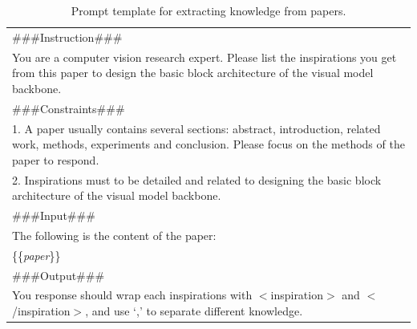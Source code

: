 \begin{table}[htbp]
    \centering
    \caption{Prompt template for extracting knowledge from papers.}
    \begin{tabular}{p{}}
        \hline
        \#\#\#Instruction\#\#\#\\
        You are a computer vision research expert.
        Please list the inspirations you get from this paper to design the basic block architecture of the visual model backbone.\\
        \#\#\#Constraints\#\#\#\\
        1. A paper usually contains several sections: abstract, introduction, related work, methods, experiments and conclusion. Please focus on the methods of the paper to respond.\\
        2. Inspirations must to be detailed and related to designing the basic block architecture of the visual model backbone.\\
        \#\#\#Input\#\#\#\\
        The following is the content of the paper:\\
        \{\{\textit{paper}\}\}\\
        \#\#\#Output\#\#\#\\
        You response should wrap each inspirations with $<$inspiration$>$ and $<$/inspiration$>$, and use `,' to separate different knowledge.\\
        \hline
    \end{tabular}
    \label{tab:prompt_reader2}
\end{table}
